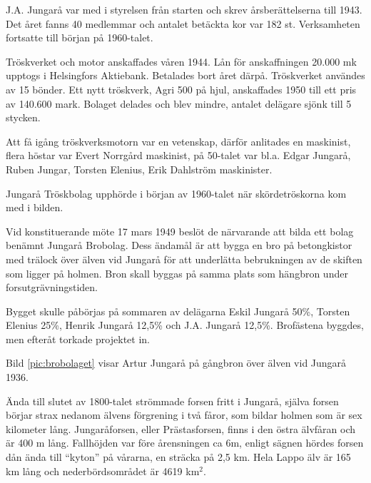 J.A. Jungarå var med i styrelsen från starten och skrev årsberättelserna till 1943. Det året fanns 40 medlemmar och antalet betäckta kor var 182 st. Verksamheten fortsatte till början 	på 1960-talet.



%


Tröskverket och motor anskaffades våren 1944. Lån för anskaffningen 20.000 mk upptogs i Helsingfors Aktiebank. Betalades bort året därpå. Tröskverket användes av 15 bönder. Ett nytt tröskverk, Agri 500 på hjul, anskaffades 1950 till ett pris av 140.600 mark. Bolaget delades och blev mindre, antalet delägare sjönk till 5 stycken.

Att få igång tröskverksmotorn var en vetenskap, därför anlitades en maskinist, flera höstar var Evert Norrgård maskinist, på 50-talet var bl.a. Edgar Jungarå, Ruben Jungar, Torsten Elenius, Erik Dahlström maskinister.

Jungarå Tröskbolag upphörde i början av 1960-talet när skördetröskorna kom med i bilden.



%


Vid konstituerande möte 17 mars 1949 beslöt de närvarande att bilda ett bolag benämnt Jungarå Brobolag. Dess ändamål är att bygga en bro på betongkistor med trälock över älven vid Jungarå för att underlätta 		 bebrukningen av de skiften som ligger på holmen. Bron skall byggas på samma plats som hängbron under  forsutgrävningstiden.

Bygget skulle påbörjas på sommaren av delägarna Eskil Jungarå 50\%, Torsten Elenius 25\%, Henrik Jungarå 12,5\% och J.A. Jungarå 12,5\%. Brofästena byggdes, men efteråt torkade projektet in.

Bild \ref{pic:brobolaget} visar Artur Jungarå på gångbron över älven vid Jungarå 1936.\jhvspace[2]



%


Ända till slutet av 1800-talet strömmade forsen fritt i Jungarå, själva forsen börjar strax nedanom älvens förgrening i två fåror, som bildar holmen som är sex kilometer lång. Jungaråforsen, eller Prästasforsen, finns i den östra älvfåran och är 400 m lång. Fallhöjden var före årensningen ca 6m, enligt sägnen hördes forsen dån ända till ``kyton'' på vårarna, en  sträcka på 2,5 km. Hela Lappo älv är 165 km lång och nederbördsområdet är 4619 km$^2$.

